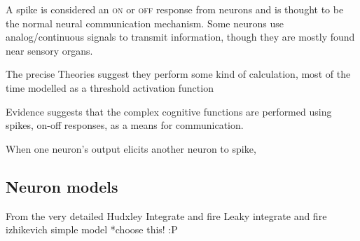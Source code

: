 A spike is considered an \textsc{on} or \textsc{off} response from neurons and is thought to be the normal neural communication mechanism. Some neurons use analog/continuous signals to transmit information, though they are mostly found near sensory organs.



The precise Theories suggest they perform some kind of calculation, most of the time modelled as a threshold activation function

Evidence suggests that the complex cognitive functions are performed using spikes, on-off responses, as a means for communication.

When one neuron's output elicits another neuron to spike, 

\subsection{Neuron models}

From the very detailed Hudxley
Integrate and fire
Leaky integrate and fire
izhikevich simple model *choose this! :P